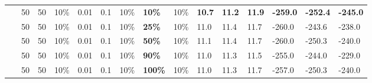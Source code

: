 \begin{table}
\begin{tabular}{|l|l|l|l|l|l|l|l|l||l|l|l|l|l|l|}
    ~ & 50 & 50 & 10\% & 0.01 & 0.1 & 10\% & \textbf{10\%} & 10\% & \textbf{10.7} & \textbf{11.2} & \textbf{11.9} & \textbf{-259.0} & \textbf{-252.4} & \textbf{-245.0} \\
    ~ & 50 & 50 & 10\% & 0.01 & 0.1 & 10\% & \textbf{25\%} & 10\% & 11.0 & 11.4 & 11.7 & -260.0 & -243.6 & -238.0 \\
    ~ & 50 & 50 & 10\% & 0.01 & 0.1 & 10\% & \textbf{50\%} & 10\% & 11.1 & 11.4 & 11.7 & -260.0 & -250.3 & -240.0 \\
    ~ & 50 & 50 & 10\% & 0.01 & 0.1 & 10\% & \textbf{90\%} & 10\% & 11.0 & 11.3 & 11.5 & -255.0 & -244.0 & -229.0 \\
    ~ & 50 & 50 & 10\% & 0.01 & 0.1 & 10\% & \textbf{100\%} & 10\% & 11.0 & 11.3 & 11.7 & -257.0 & -250.3 & -240.0 \\


\end{tabular}
\end{table}
